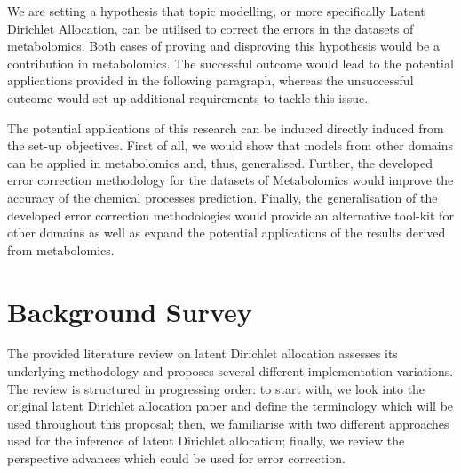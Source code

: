 \documentclass{mprop}
\begin{document}
\par We are setting a hypothesis that topic modelling, or more specifically Latent Dirichlet Allocation, can be utilised to correct the errors in the datasets of metabolomics. Both cases of proving and disproving this hypothesis would be a contribution in metabolomics. The successful outcome would lead to the potential applications provided in the following paragraph, whereas the unsuccessful outcome would set-up additional requirements to tackle this issue.

\par The potential applications of this research can be induced directly induced from the set-up objectives. First of all, we would show that models from other domains can be applied in metabolomics and, thus, generalised. Further, the developed error correction methodology for the datasets of Metabolomics would improve the accuracy of the chemical processes prediction. Finally, the generalisation of the developed error correction methodologies would provide an alternative tool-kit for other domains as well as expand the potential applications of the results derived from metabolomics. 

\section{Background Survey}

\par The provided literature review on latent Dirichlet allocation assesses its underlying methodology and proposes several different implementation variations. The review is structured in progressing order: to start with, we look into the original latent Dirichlet allocation paper and define the terminology which will be used throughout this proposal; then, we familiarise with two different approaches used for the inference of latent Dirichlet allocation;  finally, we review the perspective advances which could be used for error correction.
\end{document}
